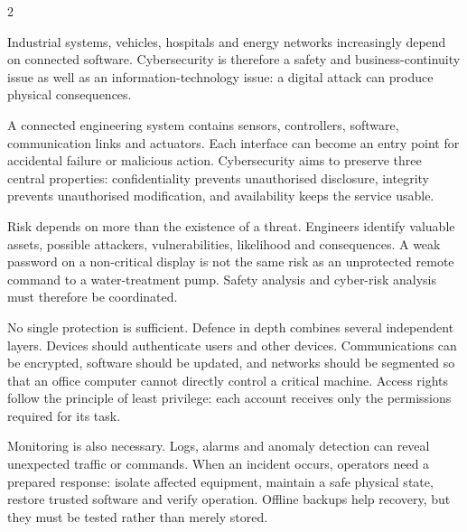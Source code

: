 

\begin{multicols}{2}
\begin{engineeringnews}
Industrial systems, vehicles, hospitals and energy networks increasingly depend on connected
software. Cybersecurity is therefore a safety and business-continuity issue as well as an
information-technology issue: a digital attack can produce physical consequences.
\end{engineeringnews}

\begin{ecarticle}
A connected engineering system contains sensors, controllers, software, communication links and
actuators. Each interface can become an entry point for accidental failure or malicious action.
Cybersecurity aims to preserve three central properties: confidentiality prevents unauthorised
disclosure, integrity prevents unauthorised modification, and availability keeps the service usable.

Risk depends on more than the existence of a threat. Engineers identify valuable assets, possible
attackers, vulnerabilities, likelihood and consequences. A weak password on a non-critical display
is not the same risk as an unprotected remote command to a water-treatment pump. Safety analysis
and cyber-risk analysis must therefore be coordinated.

No single protection is sufficient. Defence in depth combines several independent layers. Devices
should authenticate users and other devices. Communications can be encrypted, software should be
updated, and networks should be segmented so that an office computer cannot directly control a
critical machine. Access rights follow the principle of least privilege: each account receives only
the permissions required for its task.

Monitoring is also necessary. Logs, alarms and anomaly detection can reveal unexpected traffic or
commands. When an incident occurs, operators need a prepared response: isolate affected equipment,
maintain a safe physical state, restore trusted software and verify operation. Offline backups help
recovery, but they must be tested rather than merely stored.


\end{ecarticle}
\end{multicols}
